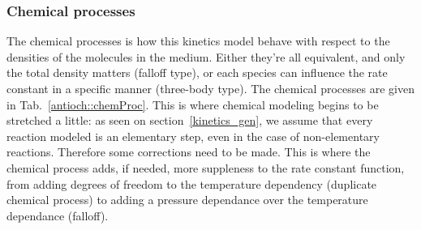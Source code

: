 \subsubsection{Chemical processes}
\label{subsec:chem_proc}
The chemical processes is how this kinetics model behave with respect to
the densities of the molecules in the medium. Either they're all equivalent,
and only the total density matters (falloff type), or each species can 
influence the rate constant in a specific manner (three-body type).
The chemical processes are given in Tab.~\ref{antioch::chemProc}. This is where
chemical modeling begins to be stretched a little: as seen on section~\ref{kinetics_gen},
we assume that every reaction modeled is an elementary step, even in the case of
non-elementary reactions. Therefore some corrections need to be made. This is where
the chemical process adds, if needed, more suppleness to the rate constant
function, from adding degrees of freedom to the temperature dependency (duplicate
chemical process) to adding a pressure dependance over the temperature dependance
(falloff).
